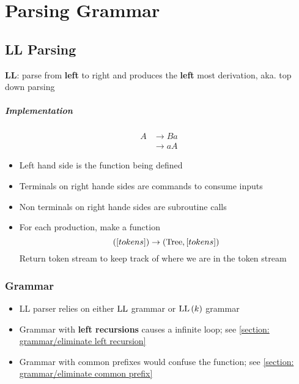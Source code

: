 \chapter{Parsing Grammar}

\section{LL Parsing}

  \begin{definition}
    \textbf{LL}: parse from \textbf{left} to right and produces the
    \textbf{left} most derivation, aka. top down parsing
  \end{definition}

  \paragraph{Implementation}
  \begin{align*}
    A
    &\to B a \\
    &\to a A
  \end{align*}
  \begin{itemize}
    \item Left hand side is the function being defined
    \item Terminals on right hande sides are commands to consume inputs
    \item Non terminals on right hande sides are subroutine calls
    \item For each production, make a function
    \begin{equation*}
      \left( \left[ tokens \right] \right) \to
      \left( \operatorname{Tree}, \left[ tokens \right] \right)
    \end{equation*}
    Return token stream to keep track of where we are in the token stream
  \end{itemize}

  \subsection{Grammar}

    \begin{itemize}
      \item LL parser relies on either $ \operatorname{LL} $ grammar or
      $ \operatorname{LL}\left( k \right) $ grammar
      \item Grammar with \textbf{left recursions} causes a infinite loop;
      see \ref{section: grammar/eliminate left recursion}
      \item Grammar with common prefixes would confuse the function;
      see \ref{section: grammar/eliminate common prefix}
    \end{itemize}

